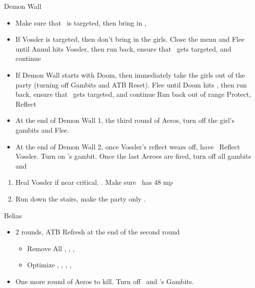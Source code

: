 \begin{gambit}
	\begin{itemize}
	\end{itemize}
\end{gambit}
\begin{battle}{Demon Wall}
	\begin{itemize}
		\item Make sure that \vaan\ is targeted, then bring in \ashe, \penelo
		\item If Vossler is targeted, then don't bring in the girls. Close the menu and Flee until Annul hits Vossler, then run back, ensure that \vaan\ gets targeted, and continue
		\item If Demon Wall starts with Doom, then immediately take the girls out of the party (turning off Gambits and ATB Reset). Flee until Doom hits \vaan, then run back, ensure that \vaan\ gets targeted, and continue
		      \vaanf Run back out of range
		      \vaanf Protect, Reflect \vaan
		\item At the end of Demon Wall 1, the third round of Aeros, turn off the girl's gambits and Flee.
		\item At the end of Demon Wall 2, once Vossler's reflect wears off, have \vaan\ Reflect Vossler. Turn on \vaan's gambit. Once the last Aeroes are fired, turn off all gambits and \leader{\ashe}
	\end{itemize}
\end{battle}
\begin{enumerate}
	\vaanf Reflect \ashe, \penelo\ reflect \penelo
	\item Heal Vossler if near critical. . Make sure \penelo\ has 48 mp
	\item Run down the stairs, make the party only \basch.
\end{enumerate}
\begin{battle}{Belias}
	\begin{itemize}
		\vaanf Reflect Vossler, then pick up chest
		\ashef Cure \vaan\ (to 650+ HP), Gambit On
		\vaanf Reflect \vaan, \penelo\ Gambit On
		\item 2 rounds, ATB Refresh at the end of the second round
		      \begin{equip}
			      \begin{itemize}
				      \item Remove All \vaan, \penelo, \ashe, \basch
				      \item Optimize \basch, \balthier, \vaan, \ashe, \penelo
			      \end{itemize}
		      \end{equip}
		\item One more round of Aeros to kill. Turn off \ashe\ and \penelo's Gambits.
	\end{itemize}
\end{battle}
